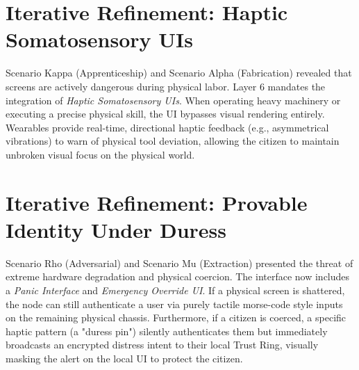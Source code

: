 \section{Iterative Refinement: Haptic Somatosensory UIs}
Scenario Kappa (Apprenticeship) and Scenario Alpha (Fabrication) revealed that screens are actively dangerous during physical labor. Layer 6 mandates the integration of \textit{Haptic Somatosensory UIs}. When operating heavy machinery or executing a precise physical skill, the UI bypasses visual rendering entirely. Wearables provide real-time, directional haptic feedback (e.g., asymmetrical vibrations) to warn of physical tool deviation, allowing the citizen to maintain unbroken visual focus on the physical world.

\section{Iterative Refinement: Provable Identity Under Duress}
Scenario Rho (Adversarial) and Scenario Mu (Extraction) presented the threat of extreme hardware degradation and physical coercion. The interface now includes a \textit{Panic Interface} and \textit{Emergency Override UI}. If a physical screen is shattered, the node can still authenticate a user via purely tactile morse-code style inputs on the remaining physical chassis. Furthermore, if a citizen is coerced, a specific haptic pattern (a "duress pin") silently authenticates them but immediately broadcasts an encrypted distress intent to their local Trust Ring, visually masking the alert on the local UI to protect the citizen.
